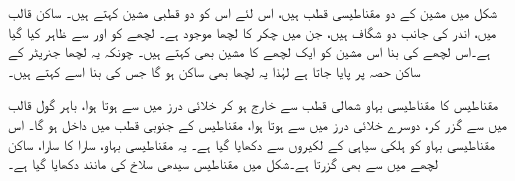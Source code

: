 شکل  میں  مشین کے دو مقناطیسی  قطب ہیں، اس لئے اس کو دو قطبی مشین کہتے ہیں۔ ساکن قالب میں، اندر کی جانب دو  شگاف ہیں، جن میں   چکر کا لچھا موجود ہے۔ لچھے کو  اور  سے ظاہر کیا گیا ہے۔اس لچھے کی بنا اس مشین کو ایک لچھے کا مشین بھی کہتے ہیں۔ چونکہ یہ لچھا جنریٹر کے ساکن حصہ پر پایا جاتا ہے لہٰذا  یہ لچھا  بھی ساکن  ہو گا جس کی بنا اسے   کہتے ہیں۔

مقناطیس کا مقناطیسی بہاو شمالی قطب   سے خارج ہو کر خلائی درز میں سے ہوتا ہوا، باہر گول قالب میں سے گزر کر، دوسرے خلائی درز میں سے ہوتا ہوا، مقناطیس کے جنوبی قطب    میں داخل ہو گا۔ اس مقناطیسی بہاو کو  ہلکی سیاہی کے لکیروں سے دکھایا گیا ہے۔  یہ  مقناطیسی بہاو، سارا کا سارا، ساکن لچھے میں سے بھی گزرتا ہے۔شکل   میں مقناطیس سیدھی سلاخ کی مانند دکھایا گیا ہے۔

